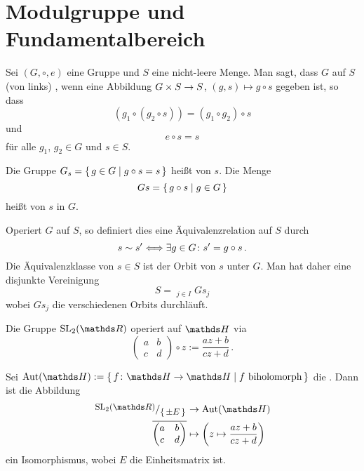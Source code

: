 \section{Modulgruppe und Fundamentalbereich}

\begin{defi}
Sei $(G, \circ, e)$ eine Gruppe und $S$ eine nicht-leere Menge. Man sagt, dass $G$ auf $S$ (von links) , wenn eine Abbildung $G \times S \rightarrow S$, $(g, s) \mapsto g \circ s$ gegeben ist, so dass
\[
	(g_1 \circ (g_2 \circ s)) = (g_1 \circ g_2) \circ s
\]
und
\[
	e \circ s = s
\]
für alle $g_1$, $g_2 \in G$ und $s \in S$.

Die Gruppe $G_s = \left\{\,g \in G \mid g \circ s = s\,\right\}$ heißt  von $s$.
Die Menge
\[
	Gs = \left\{\,g \circ s \mid g\in G\,\right\}
\]
heißt  von $s$ in $G$.
\end{defi}

Operiert $G$ auf $S$, so definiert dies eine Äquivalenzrelation auf $S$ durch
\[
	s \sim s'
	\Longleftrightarrow \exists g \in G\colon s' = g \circ s
	\,.
\]
Die Äquivalenzklasse von $s \in S$ ist der Orbit von $s$ unter $G$.
Man hat daher eine disjunkte Vereinigung
\[
	S = \mathop{\stackrel{\bullet}{\bigcup}}_{j\in I} Gs_j
\]
wobei $Gs_j$ die verschiedenen Orbits durchläuft.

\begin{satz-list}
\item Die Gruppe $\SL_2(\RR)$ operiert auf $\HH$ via
\[
		\begin{pmatrix}
			a & b \\
			c & d
		\end{pmatrix}
		\circ z
	:= \frac{az+b}{cz+d}
	\,.
\]

\item Sei $\Aut(\HH) := \Set{f\colon\HH \ra \HH \mid f \text{ biholomorph}}$ die .
Dann ist die Abbildung
\begin{align*}
	\modulo{\SL_2(\RR)}{\Set{\pm E}} &\ra \Aut(\HH)\\
		\overline{\begin{pmatrix}
			a & b \\
			c & d
		\end{pmatrix}}
		&\mapsto
		\left( z \mapsto \frac{az+b}{cz+d} \right)
\end{align*}
ein Isomorphismus, wobei $E$ die Einheitsmatrix ist.
\end{satz-list}

